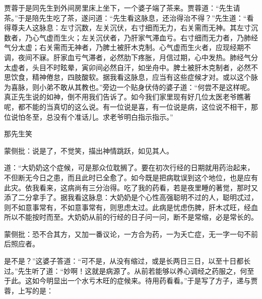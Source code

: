 \begin{parag}


    贾蓉于是同先生到外间房里床上坐下，一个婆子端了茶来。贾蓉道：“先生请茶。”于是陪先生吃了茶，遂问道：“先生看这脉息，还治得治不得？”先生道：“看得尊夫人这脉息：左寸沉数，左关沉伏，右寸细而无力，右关需而无神。其左寸沉数者，乃心气虚而生火；左关沉伏者，乃肝家气滞血亏。右寸细而无力者，乃肺经气分太虚；右关需而无神者，乃脾土被肝木克制。心气虚而生火者，应现经期不调，夜间不寐。肝家血亏气滞者，必然肋下疼胀，月信过期，心中发热。肺经气分太虚者，头目不时眩晕，寅卯间必然自汗，如坐舟中。脾土被肝木克制者，必然不思饮食，精神倦怠，四肢酸软。据我看这脉息，应当有这些症候才对。或以这个脉为喜脉，则小弟不敢从其教也。”旁边一个贴身伏侍的婆子道：“何尝不是这样呢。真正先生说的如神，倒不用我们告诉了。如今我们家里现有好几位太医老爷瞧著呢，都不能的当真切的这么说。有一位说是喜，有一位说是病，这位说不相干，那位说怕冬至，总没有个准话儿。求老爷明白指示指示。”
\end{parag}


\begin{parag}


    那先生笑\begin{note}蒙侧批：说是了，不觉笑，描出神情跳跃，如见其人。\end{note}道：“大奶奶这个症候，可是那众位耽搁了。要在初次行经的日期就用药治起来，不但断无今日之患，而且此时已全愈了。如今既是把病耽误到这个地位，也是应有此灾。依我看来，这病尚有三分治得。吃了我的药看，若是夜里睡的著觉，那时又添了二分拿手了。据我看这脉息：大奶奶是个心性高强聪明不过的人，聪明忒过，则不如意事常有，不如意事常有，则思虑太过。此病是忧虑伤脾，肝木忒旺，经血所以不能按时而至。大奶奶从前的行经的日子问一问，断不是常缩，必是常长的。\begin{note}蒙侧批：恐不合其方，又加一番议论，一方合为药，一为夭亡症，无一字一句不前后照应者。\end{note}是不是？”这婆子答道：“可不是，从没有缩过，或是长两日三日，以至十日都长过。”先生听了道：“妙啊！这就是病源了。从前若能够以养心调经之药服之，何至于此。这如今明显出一个水亏木旺的症候来。待用药看看。”于是写了方子，递与贾蓉，上写的是：
\end{parag}

